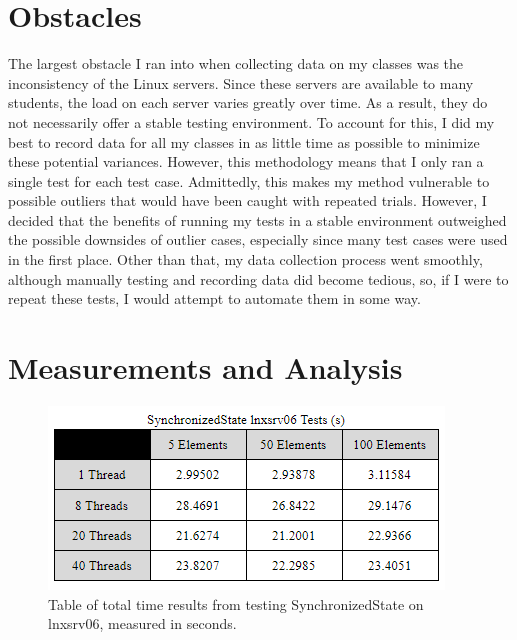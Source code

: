 \section{Obstacles}

The largest obstacle I ran into when collecting data on my classes was the
inconsistency of the Linux servers. Since these servers are available to many
students, the load on each server varies greatly over time. As a result, they do
not necessarily offer a stable testing environment. To account for this, I did
my best to record data for all my classes in as little time as possible to
minimize these potential variances. However, this methodology means that I only
ran a single test for each test case. Admittedly, this makes my method vulnerable
to possible outliers that would have been caught with repeated trials. However,
I decided that the benefits of running my tests in a stable environment 
outweighed the possible downsides of outlier cases, especially since many test cases
were used in the first place. Other than that, my data collection process went 
smoothly, although manually testing and recording data did become tedious, so, if I
were to repeat these tests, I would attempt to automate them in some way.

\section{Measurements and Analysis}

\begin{figure}
  \includegraphics[scale=0.8]{./Assets/synchronized-06.png}
  \caption{\label{fig:vectors} Table of total time results from testing SynchronizedState on lnxsrv06, measured in seconds. }
\end{figure}

